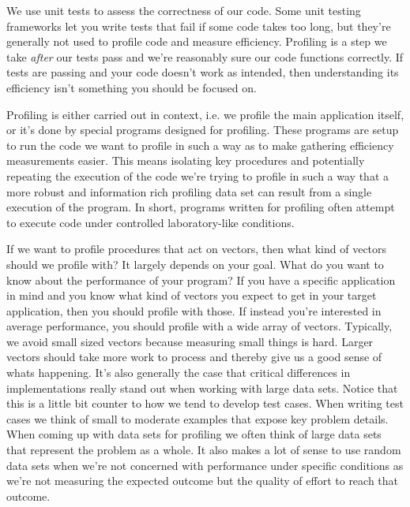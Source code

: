 \documentclass[]{tufte-handout}
\begin{document}
We use unit tests to assess the correctness of our code.  Some unit testing frameworks let you write tests that fail if some code takes too long, but they're generally not used to profile code and measure efficiency.  Profiling is a step we take \textit{after} our tests pass and we're reasonably sure our code functions correctly.  If tests are passing and your code doesn't work as intended, then understanding its efficiency isn't something you should be focused on.  

Profiling is either carried out in context, i.e. we profile the main application itself, or it's done by special programs designed for profiling.  These programs are setup to run the code we want to profile in such a way as to make gathering efficiency measurements easier. This means isolating key procedures and potentially repeating the execution of the code we're trying to profile in such a way that a more robust and information rich profiling data set can result from a single execution of the program.  In short, programs written for profiling often attempt to execute code under controlled laboratory-like conditions.  

If we want to profile procedures that act on vectors, then what kind of vectors should we profile with?  It largely depends on your goal. What do you want to know about the performance of your program? If you have a specific application in mind and you know what kind of vectors you expect to get in your target application, then you should profile with those.  If instead you're interested in average performance, you should profile with a wide array of vectors.  Typically, we avoid small sized vectors because measuring small things is hard.  Larger vectors should take more work to process and thereby give us a good sense of whats happening. It's also generally the case that critical differences in implementations really stand out when working with large data sets. Notice that this is a little bit counter to how we tend to develop test cases.  When writing test cases we think of small to moderate examples that expose key problem details.  When coming up with data sets for profiling we often think of large data sets that represent the problem as a whole.  It also makes a lot of sense to use random data sets when we're not concerned with performance under specific conditions as we're not measuring the expected outcome but the quality of effort to reach that outcome. 
\end{document}
